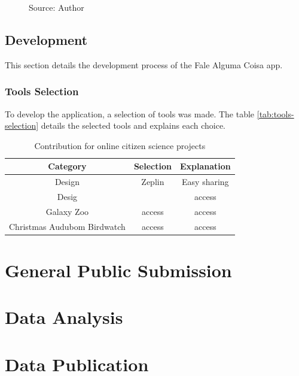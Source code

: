 \begin{figure}[ht]
    \caption*{Source: Author}
    \label{fig:falealgumacoisa-delete-user-data-page-design}
\end{figure}

\subsection{Development}

This section details the development process of the Fale Alguma Coisa app.

\subsubsection{Tools Selection}

To develop the application, a selection of tools was made. The table \ref{tab:tools-selection} details the selected tools and explains each choice.

\begin{table}[h]
    \centering
    \begin{tabular}{|c|c|c|}
        \hline Category & Selection & Explanation \\
        \hline Design & Zeplin & Easy sharing  \\ 
        \hline Desig &  & access \\ 
        \hline Galaxy Zoo & access & access \\ 
        \hline Christmas Audubom Birdwatch & access & access \\ \hline 
    \end{tabular}
    \caption{Contribution for online citizen science projects}
    \label{tab:cs-contributions}
\end{table}


\section{General Public Submission}
\label{sec:proposal-public-submission}

\section{Data Analysis}
\label{sec:proposal-data-analysis}

\section{Data Publication}
\label{sec:proposal-data-publication}